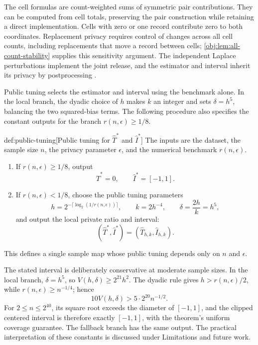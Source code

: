 The cell formulas are count-weighted sums of symmetric pair contributions. They can be computed from cell totals, preserving the pair construction while retaining a direct implementation. Cells with zero or one record contribute zero to both coordinates. Replacement privacy requires control of changes across all cell counts, including replacements that move a record between cells; \cref{obj:lem:all-count-stability} supplies this sensitivity argument. The independent Laplace perturbations implement the joint release, and the estimator and interval inherit its privacy by postprocessing \citep{Dwork2006,Dwork2014}.

Public tuning selects the estimator  and interval  using the benchmark alone. In the local branch, the dyadic choice of \(h\) makes \(k\) an integer and sets \(\delta=h^5\), balancing the two squared-bias terms. The following procedure also specifies the constant outputs for the branch \(r(n,\epsilon)\ge1/8\).
\begin{algorithmv}{def:public-tuning}[Public tuning for \(\widehat T^*\) and \(\widehat I^*\)]
The inputs are the dataset, the sample size \(n\), the privacy parameter \(\epsilon\), and the numerical benchmark \(r(n,\epsilon)\).
\begin{enumerate}
\item If \(r(n,\epsilon)\ge1/8\), output
\[
\widehat T^*=0,
\qquad
\widehat I^*=[-1,1].
\]

\item If \(r(n,\epsilon)<1/8\), choose the public tuning parameters
\[
h=2^{-\lceil\log_2(1/r(n,\epsilon))\rceil},
\qquad
k=2h^{-4},
\qquad
\delta=\frac{2h}{k}=h^5,
\]
and output the local private ratio and interval:
\[
(\widehat T^*,\widehat I^*)
=
(\widehat T_{h,k},\widehat I_{h,k}).
\]
\end{enumerate}
This defines a single sample map whose public tuning depends only on \(n\) and \(\epsilon\).
\end{algorithmv}

The stated interval is deliberately conservative at moderate sample sizes. In the local branch, \(\delta=h^5\), so \(V(h,\delta)\ge 2^{21}h^2\). The dyadic rule gives \(h>r(n,\epsilon)/2\), while \(r(n,\epsilon)\ge n^{-1/4}\); hence
\[
10V(h,\delta)>5\cdot 2^{20}n^{-1/2}.
\]
For \(2\le n\le 2^{40}\), its square root exceeds the diameter of \([-1,1]\), and the clipped centered interval is therefore exactly \([-1,1]\), with the theorem's uniform coverage guarantee. The fallback branch has the same output. The practical interpretation of these constants is discussed under Limitations and future work.

